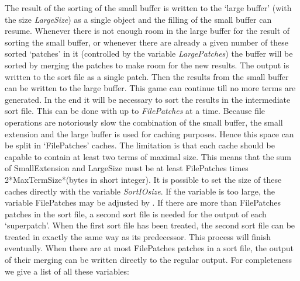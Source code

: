 The result of the sorting of the small buffer is written to the 
`large buffer' (with the size {\sl 
LargeSize}) as a single object and the filling of the 
small buffer can resume. Whenever there is not enough room in the large 
buffer for the result of sorting the small buffer, or whenever there are 
already a given number of these sorted `patches' in it (controlled by the 
variable {\sl LargePatches}) the buffer will be sorted 
by merging the patches to make room for the new results. The 
output is written to the sort file as a single patch. Then the results from 
the small buffer can be written to the large buffer. This game can continue 
till no more terms are generated. In the end it will be necessary to sort 
the results in the intermediate sort file. This can be 
done with up to {\sl FilePatches} at a time. Because 
file operations are notoriously slow the combination of the small buffer, 
the small extension and the large buffer is used for caching 
purposes. Hence this space can be split in `FilePatches' caches. The 
limitation is that each cache should be capable to contain at least two 
terms of maximal size. This means that the sum of SmallExtension and 
LargeSize must be at least FilePatches times 2*MaxTermSize*(bytes in short 
integer). It is possible to set the size of these caches directly with the 
variable {\sl SortIOsize}. If the variable is too large, 
the variable FilePatches may be adjusted by \FORM\@. If there are more than 
FilePatches patches in the sort file, a second sort file is needed for the 
output of each `superpatch'. When the first sort file has 
been treated, the second sort file can be treated in exactly the same way 
as its predecessor. This process will finish eventually. When there are at 
most FilePatches patches in a sort file, the output of their merging can be 
written directly to the regular output. For completeness we give a list of 
all these variables:




